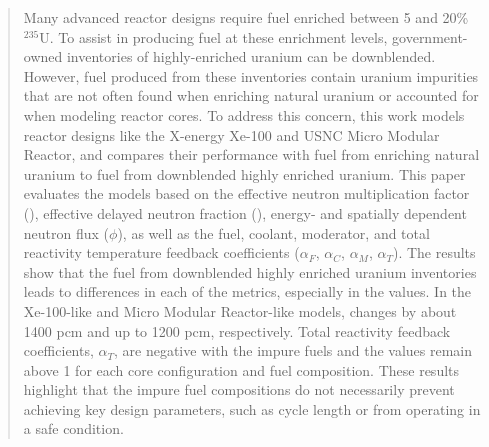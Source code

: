\begin{abstract}
Many advanced reactor designs require fuel enriched 
between 5 and 20\% $^{235}$U. To assist in producing 
fuel at these enrichment levels, government-owned 
inventories of highly-enriched uranium can be downblended. However, 
fuel produced from these inventories contain uranium 
impurities that are not often found when enriching natural 
uranium or accounted for when modeling reactor cores. To 
address this concern, this work models reactor 
designs like the X-energy Xe-100 and 
USNC Micro Modular Reactor, 
and compares their performance with  
fuel from enriching natural uranium to fuel from downblended 
highly enriched uranium. This paper evaluates the models based on 
the effective neutron 
multiplication factor (\keff), effective delayed 
neutron fraction (\betaEff), energy- and spatially dependent 
neutron flux ($\phi$), as well as the fuel, coolant, moderator, 
and total reactivity 
temperature feedback coefficients ($\alpha_F$, $\alpha_C$, 
$\alpha_M$, $\alpha_T$). The results 
show that the fuel from downblended highly enriched uranium 
inventories leads to differences in each of the metrics, 
especially in the \keff values. In the
Xe-100-like and Micro Modular Reactor-like models, 
\keff changes by about 1400 pcm and up to 1200 pcm, respectively. Total reactivity feedback coefficients, $\alpha_T$, are negative with the 
impure fuels and the \keff values remain above 1 
for each core configuration and fuel composition.
These results highlight that the impure fuel 
compositions do not necessarily prevent achieving key design 
parameters, such as cycle length or from operating in 
a safe condition.  
\end{abstract}
